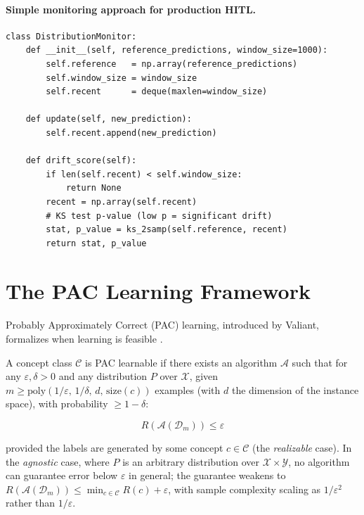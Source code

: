 \paragraph{Simple monitoring approach for production HITL.}

\begin{lstlisting}[style=python, caption={Distribution monitor with KS-test drift detection}]
class DistributionMonitor:
    def __init__(self, reference_predictions, window_size=1000):
        self.reference   = np.array(reference_predictions)
        self.window_size = window_size
        self.recent      = deque(maxlen=window_size)

    def update(self, new_prediction):
        self.recent.append(new_prediction)

    def drift_score(self):
        if len(self.recent) < self.window_size:
            return None
        recent = np.array(self.recent)
        # KS test p-value (low p = significant drift)
        stat, p_value = ks_2samp(self.reference, recent)
        return stat, p_value
\end{lstlisting}

\section{The PAC Learning Framework}

Probably Approximately Correct (PAC) learning, introduced by Valiant, formalizes when learning is feasible \autocite{valiant1984theory}.

A concept class $\mathcal{C}$ is PAC learnable if there exists an algorithm $\mathcal{A}$ such that for any $\varepsilon, \delta > 0$ and any distribution $P$ over $\mathcal{X}$, given $m \geq \mathrm{poly}(1/\varepsilon,\, 1/\delta,\, d,\, \mathrm{size}(c))$ examples (with $d$ the dimension of the instance space), with probability $\geq 1 - \delta$:

\[
R\!\left(\mathcal{A}(\mathcal{D}_m)\right) \leq \varepsilon
\]

provided the labels are generated by some concept $c \in \mathcal{C}$ (the \emph{realizable} case). In the \emph{agnostic} case, where $P$ is an arbitrary distribution over $\mathcal{X} \times \mathcal{Y}$, no algorithm can guarantee error below $\varepsilon$ in general; the guarantee weakens to $R\!\left(\mathcal{A}(\mathcal{D}_m)\right) \leq \min_{c \in \mathcal{C}} R(c) + \varepsilon$, with sample complexity scaling as $1/\varepsilon^2$ rather than $1/\varepsilon$.


